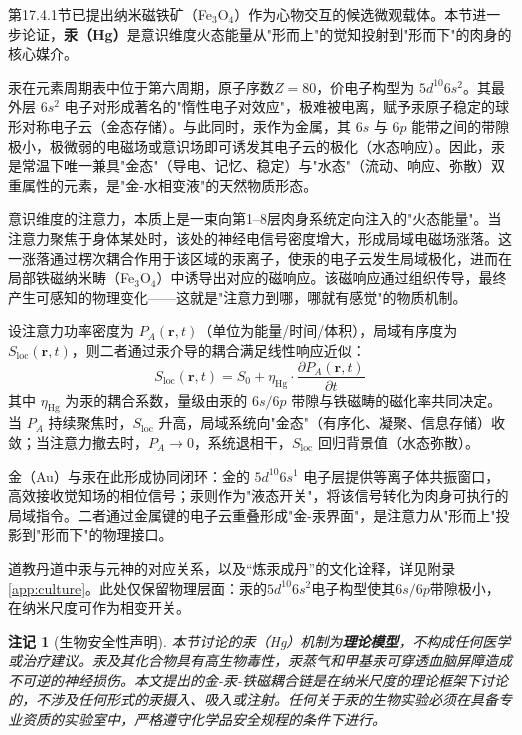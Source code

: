 \documentclass[12pt,a4paper,twocolumn]{article}
\newtheorem{remark}[theorem]{注记}
\begin{document}
第17.4.1节已提出纳米磁铁矿（Fe$_3$O$_4$）作为心物交互的候选微观载体。本节进一步论证，\textbf{汞（Hg）}是意识维度火态能量从"形而上"的觉知投射到"形而下"的肉身的核心媒介。

汞在元素周期表中位于第六周期，原子序数$Z=80$，价电子构型为 $5d^{10}6s^2$。其最外层 $6s^2$ 电子对形成著名的"惰性电子对效应"，极难被电离，赋予汞原子稳定的球形对称电子云（金态存储）。与此同时，汞作为金属，其 $6s$ 与 $6p$ 能带之间的带隙极小，极微弱的电磁场或意识场即可诱发其电子云的极化（水态响应）。因此，汞是常温下唯一兼具"金态"（导电、记忆、稳定）与"水态"（流动、响应、弥散）双重属性的元素，是"金-水相变液"的天然物质形态。

意识维度的注意力，本质上是一束向第1--8层肉身系统定向注入的"火态能量"。当注意力聚焦于身体某处时，该处的神经电信号密度增大，形成局域电磁场涨落。这一涨落通过楞次耦合作用于该区域的汞离子，使汞的电子云发生局域极化，进而在局部铁磁纳米畴（Fe$_3$O$_4$）中诱导出对应的磁响应。该磁响应通过组织传导，最终产生可感知的物理变化——这就是"注意力到哪，哪就有感觉"的物质机制。

设注意力功率密度为 $P_A(\mathbf{r}, t)$（单位为能量/时间/体积），局域有序度为 $S_{\text{loc}}(\mathbf{r}, t)$，则二者通过汞介导的耦合满足线性响应近似：
\begin{equation}
S_{\text{loc}}(\mathbf{r}, t) = S_0 + \eta_{\text{Hg}} \cdot \frac{\partial P_A(\mathbf{r}, t)}{\partial t}
\end{equation}
其中 $\eta_{\text{Hg}}$ 为汞的耦合系数，量级由汞的 $6s/6p$ 带隙与铁磁畴的磁化率共同决定。当 $P_A$ 持续聚焦时，$S_{\text{loc}}$ 升高，局域系统向"金态"（有序化、凝聚、信息存储）收敛；当注意力撤去时，$P_A \to 0$，系统退相干，$S_{\text{loc}}$ 回归背景值（水态弥散）。

金（Au）与汞在此形成协同闭环：金的 $5d^{10}6s^1$ 电子层提供等离子体共振窗口，高效接收觉知场的相位信号；汞则作为"液态开关"，将该信号转化为肉身可执行的局域指令。二者通过金属键的电子云重叠形成"金-汞界面"，是注意力从"形而上"投影到"形而下"的物理接口。

道教丹道中汞与元神的对应关系，以及``炼汞成丹''的文化诠释，详见附录\ref{app:culture}。此处仅保留物理层面：汞的$5d^{10}6s^2$电子构型使其$6s/6p$带隙极小，在纳米尺度可作为相变开关。

\begin{remark}[生物安全性声明]
本节讨论的汞（Hg）机制为\textbf{理论模型}，不构成任何医学或治疗建议。汞及其化合物具有高生物毒性，汞蒸气和甲基汞可穿透血脑屏障造成不可逆的神经损伤。本文提出的金-汞-铁磁耦合链是在\emph{纳米尺度}的理论框架下讨论的，不涉及任何形式的汞摄入、吸入或注射。任何关于汞的生物实验必须在具备专业资质的实验室中，严格遵守化学品安全规程的条件下进行。
\end{remark}
\end{document}
